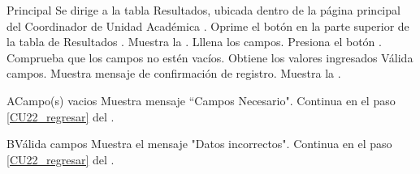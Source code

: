     \begin{UCtrayectoria}{Principal}
    \UCpaso[\UCactor] Se dirige a la tabla Resultados, ubicada dentro de la página principal del Coordinador de Unidad Académica .
    \UCpaso[\UCactor] Oprime el botón  en la parte superior de la tabla de Resultados .
    \UCpaso Muestra la . 
    \UCpaso[\UCactor] Lllena los campos. \label{CU22_regresar}  
    \UCpaso[\UCactor] Presiona el botón .
    \UCpaso Comprueba que los campos no estén vacíos. 
    \UCpaso Obtiene los valores ingresados
    \UCpaso Válida campos. 
    \UCpaso Muestra mensaje de confirmación de registro.
    \UCpaso Muestra la .
\end{UCtrayectoria}

\begin{UCtrayectoriaA}{A}{Campo(s) vacios}
	\UCpaso Muestra mensaje “Campos Necesario".
	\UCpaso Continua en el paso \ref{CU22_regresar} del .
\end{UCtrayectoriaA}

\begin{UCtrayectoriaA}{B}{Válida campos}
	\UCpaso Muestra el mensaje "Datos incorrectos".
	\UCpaso Continua en el paso \ref{CU22_regresar} del .
\end{UCtrayectoriaA}


	


